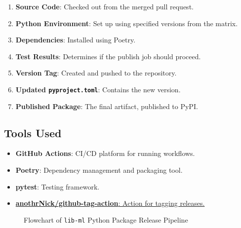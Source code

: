 \begin{enumerate}
    \item \textbf{Source Code}: Checked out from the merged pull request.
    \item \textbf{Python Environment}: Set up using specified versions from the matrix.
    \item \textbf{Dependencies}: Installed using Poetry.
    \item \textbf{Test Results}: Determines if the publish job should proceed.
    \item \textbf{Version Tag}: Created and pushed to the repository.
    \item \textbf{Updated \texttt{pyproject.toml}}: Contains the new version.
    \item \textbf{Published Package}: The final artifact, published to PyPI.
\end{enumerate}

\subsection{Tools Used}

\begin{itemize}
    \item \textbf{GitHub Actions}: CI/CD platform for running workflows.
    \item \textbf{Poetry}: Dependency management and packaging tool.
    \item \textbf{pytest}: Testing framework.
    \item \href{https://github.com/marketplace/actions/github-tag-bump}{\textbf{anothrNick/github-tag-action}: Action for tagging releases.}
\end{itemize}

\begin{figure}[h!]
    \centering
    \label{fig:lib-ml-pipeline}
    \caption{Flowchart of \texttt{lib-ml} Python Package Release Pipeline}
\end{figure}


